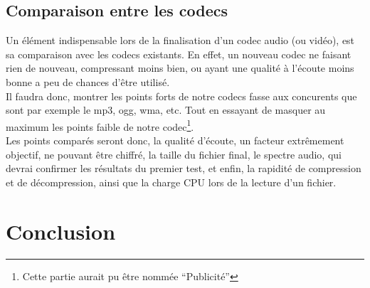 \documentclass[a4paper,12pt]{article}
\begin{document}
	\subsection{Comparaison entre les codecs}
Un élément indispensable lors de la finalisation d'un codec audio (ou vidéo),
est sa comparaison avec les codecs existants. En effet, un nouveau codec ne
faisant rien de nouveau, compressant moins bien, ou ayant une qualité à l'écoute
moins bonne a peu de chances d'être utilisé.\\
Il faudra donc, montrer les points forts de notre codecs fasse aux concurents
que sont par exemple le mp3, ogg, wma, etc. Tout en essayant de masquer au
maximum les points faible de notre codec\footnote{Cette partie aurait pu être
nommée ``Publicité''}.\\
Les points comparés seront donc, la qualité d'écoute, un facteur extrêmement
objectif, ne pouvant être chiffré, la taille du fichier final, le spectre audio,
qui devrai confirmer les résultats du premier test, et enfin, la rapidité de
compression et de décompression, ainsi que la charge CPU lors de la lecture d'un
fichier.

\newpage

\section*{Conclusion}
\end{document}

